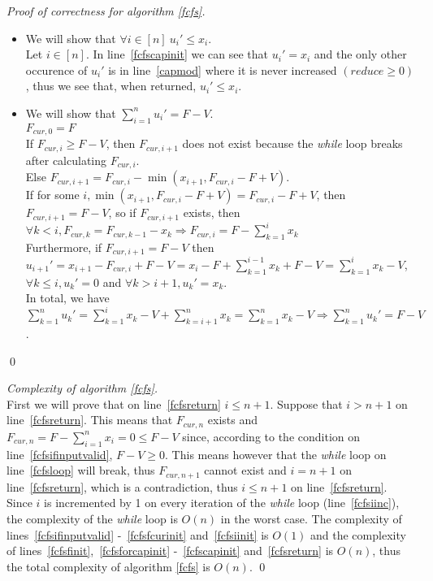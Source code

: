 \documentclass[11pt]{llncs}
\begin{document}
    \begin{proof}[Proof of correctness for algorithm \ref{fcfs}] \
       \begin{itemize}
          \item We will show that $\forall i \in [n] \: u_i' \leq x_i$. \\
          Let $i \in [n]$. In line~\ref{fcfscapinit} we can see that $u_i' = x_i$ and the only other occurence of $u_i'$
          is in line~\ref{capmod} where it is never increased $(reduce \geq 0)$, thus we see that, when returned,
          $u_i' \leq x_i$.
          \item We will show that $\sum\limits_{i=1}^{n}u_i' = F - V$. \\
          $F_{cur,0} = F$ \\
          If $F_{cur,i} \geq F - V$, then $F_{cur,i+1}$ does not exist because the \emph{while} loop breaks after calculating
          $F_{cur,i}$. \\
          Else $F_{cur,i+1} = F_{cur,i} - \min{(x_{i+1}, F_{cur,i} - F + V)}$. \\
          If for some $i, \min{(x_{i+1}, F_{cur,i} - F + V)} = F_{cur,i} - F + V$, then $F_{cur,i+1} = F - V$, so if
          $F_{cur,i+1}$ exists, then $\forall k < i, F_{cur,k} = F_{cur,k-1} - x_k \Rightarrow F_{cur,i} =
          F - \sum\limits_{k=1}^{i}x_k$ \\
          Furthermore, if $F_{cur,i+1} = F - V$ then $u_{i+1}' = x_{i+1} - F_{cur,i} + F - V =
          x_i - F + \sum\limits_{k=1}^{i-1}x_k + F - V = \sum\limits_{k=1}^{i}x_k - V$, $\forall k \leq i, u_k' = 0$
          and $\forall k > i+1, u_k' = x_k$. \\
          In total, we have $\sum\limits_{k=1}^{n}u_k' = \sum\limits_{k=1}^{i}x_k - V + \sum\limits_{k=i+1}^{n}x_k =
          \sum\limits_{k=1}^{n}x_k - V \Rightarrow \sum\limits_{k=1}^{n}u_k' = F - V$.
       \end{itemize}
       \qed
    \end{proof}
    \begin{proof}[Complexity of algorithm \ref{fcfs}] \ \\
       First we will prove that on line~\ref{fcfsreturn} $i \leq n+1$. Suppose that $i > n+1$ on line~\ref{fcfsreturn}. This
       means that $F_{cur,n}$ exists and $F_{cur,n} = F - \sum\limits_{i=1}^{n}x_i = 0 \leq F - V$ since, according to the
       condition on line~\ref{fcfsifinputvalid}, $F - V \geq 0$. This means however that the \emph{while} loop on
       line~\ref{fcfsloop} will break, thus $F_{cur,n+1}$ cannot exist and $i = n + 1$ on line~\ref{fcfsreturn}, which is a
       contradiction, thus $i \leq n+1$ on line~\ref{fcfsreturn}. Since $i$ is incremented by 1 on every iteration of the
       \emph{while} loop (line~\ref{fcfsiinc}), the complexity of the \emph{while} loop is $O(n)$ in the worst case. The
       complexity of lines~\ref{fcfsifinputvalid} -~\ref{fcfsfcurinit} and~\ref{fcfsiinit} is $O(1)$ and the complexity of
       lines~\ref{fcfsfinit},~\ref{fcfsforcapinit} -~\ref{fcfscapinit} and~\ref{fcfsreturn} is $O(n)$, thus the total
       complexity of algorithm \ref{fcfs} is $O(n)$. \qed
    \end{proof}
\end{document}
